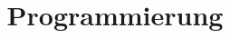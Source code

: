 
\newcommand{\frontframe}{%
    \titlepage%
    \begin{center}\extratitlepageline\end{center}%
}
\author{\authorname\\~\authormail}

\title{Programmierung}
\date{}
